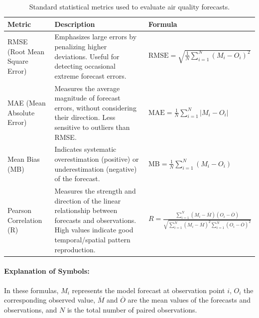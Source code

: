 \begin{table}[h!]
	\renewcommand{\arraystretch}{1.5}
	\centering
	\begin{tabular}{p{2.5cm} p{5cm} p{6cm}}
		\hline
		\textbf{Metric} & \textbf{Description} & \textbf{Formula} \\
		\hline
		RMSE (Root Mean Square Error) & Emphasizes large errors by penalizing higher deviations. Useful for detecting occasional extreme forecast errors. & 
		$\mathrm{RMSE} = \sqrt{\frac{1}{N} \sum_{i=1}^{N} (M_i - O_i)^2}$ \\
		
		MAE (Mean Absolute Error) & Measures the average magnitude of forecast errors, without considering their direction. Less sensitive to outliers than RMSE. & 
		$\mathrm{MAE} = \frac{1}{N} \sum_{i=1}^{N} |M_i - O_i|$ \\
		
		Mean Bias (MB) & Indicates systematic overestimation (positive) or underestimation (negative) of the forecast. & 
		$\mathrm{MB} = \frac{1}{N} \sum_{i=1}^{N} (M_i - O_i)$ \\
		
		Pearson Correlation (R) & Measures the strength and direction of the linear relationship between forecasts and observations. High values indicate good temporal/spatial pattern reproduction. & 
		$R = \frac{\sum_{i=1}^{N} (M_i - \overline{M})(O_i - \overline{O})}{\sqrt{\sum_{i=1}^{N} (M_i - \overline{M})^2 \sum_{i=1}^{N} (O_i - \overline{O})^2}}$ \\
		\hline
	\end{tabular}
	\caption{Standard statistical metrics used to evaluate air quality forecasts.}
	\label{tab:stats_metrics}
\end{table}

\paragraph{Explanation of Symbols:}
In these formulas, $M_i$ represents the model forecast at observation point $i$, $O_i$ the corresponding observed value, $\overline{M}$ and $\overline{O}$ are the mean values of the forecasts and observations, and $N$ is the total number of paired observations.

